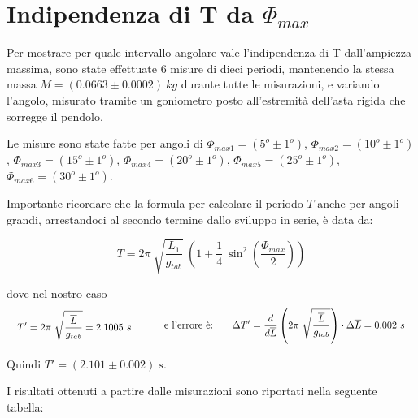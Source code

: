\documentclass[12pt, a4paper]{article}
\begin{document}
\section{Indipendenza di T da $\Phi_{max}$}
\label{Indip T da angolo}

Per mostrare per quale intervallo angolare vale l'indipendenza di T dall'ampiezza massima, sono state effettuate 6 misure di dieci periodi, mantenendo la stessa massa $M=(0.0663\pm0.0002)\ kg$ durante tutte le misurazioni, e variando l'angolo, misurato tramite un goniometro posto all'estremità dell'asta rigida che sorregge il pendolo. 
\bigskip

Le misure sono state fatte per angoli di $\Phi_{max1}=(5^o\pm1^o)$, $\Phi_{max2}=(10^o\pm1^o)$, $\Phi_{max3}=(15^o\pm1^o)$, $\Phi_{max4}=(20^o\pm1^o)$, $\Phi_{max5}=(25^o\pm1^o)$, $\Phi_{max6}=(30^o\pm1^o)$.

Importante ricordare che la formula per calcolare il periodo $T$ anche per angoli grandi, arrestandoci al secondo termine dallo sviluppo in serie, è data da:

\begin{equation*}
    T=2\pi\ \sqrt{\frac{L_1}{g_{tab}}}\ \left(1+\frac{1}{4}\ \sin^2{\left(\frac{\Phi_{max}}{2}\right)}\right)
\end{equation*}

dove nel nostro caso
\begin{equation*}
\begin{aligned}
  & & \displaystyle T'=2\pi\ \sqrt{\frac{\overline{L}}{g_{tab}}}=2.1005\ s
  &\quad{} 
  \end{aligned}
  \begin{aligned}
  & &\text{ e l'errore è:\phantom{.......}} \Delta T'=\frac{d}{d\overline{L}}\left( 2\pi\ \sqrt{\frac{\overline{L}}{g_{tab}}}\right)\cdot\Delta\overline{L}=0.002\ s
  &
  \end{aligned}
\end{equation*}
\bigskip

Quindi $T'=(2.101\pm 0.002)\ s$.


\addvspace{3cm}
I risultati ottenuti a partire dalle misurazioni sono riportati nella seguente tabella:
\end{document}
